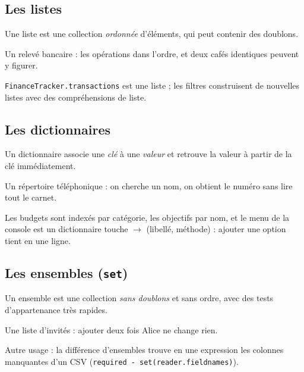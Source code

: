 \documentclass[11pt,a4paper]{article}
\newcommand{\code}[1]{{\NoAutoSpacing\texttt{#1}}}
\begin{document}
\subsection{Les listes}
\begin{definition}
Une liste est une collection \emph{ordonnée} d'éléments, qui peut contenir des doublons.
\end{definition}
\begin{analogie}
Un relevé bancaire : les opérations dans l'ordre, et deux cafés identiques peuvent y figurer.
\end{analogie}
\code{FinanceTracker.transactions} est une liste ; les filtres construisent de nouvelles
listes avec des compréhensions de liste.

\subsection{Les dictionnaires}
\begin{definition}
Un dictionnaire associe une \emph{clé} à une \emph{valeur} et retrouve la valeur à partir de
la clé immédiatement.
\end{definition}
\begin{analogie}
Un répertoire téléphonique : on cherche un nom, on obtient le numéro sans lire tout le carnet.
\end{analogie}
Les budgets sont indexés par catégorie, les objectifs par nom, et le menu de la console est un
dictionnaire \og touche $\rightarrow$ (libellé, méthode) \fg : ajouter une option tient en une
ligne.

\subsection{Les ensembles (\code{set})}
\begin{definition}
Un ensemble est une collection \emph{sans doublons} et sans ordre, avec des tests
d'appartenance très rapides.
\end{definition}
\begin{analogie}
Une liste d'invités : ajouter deux fois \og Alice \fg{} ne change rien.
\end{analogie}

Autre usage : la différence d'ensembles trouve en une expression les colonnes manquantes
d'un CSV (\code{required - set(reader.fieldnames)}).
\end{document}
